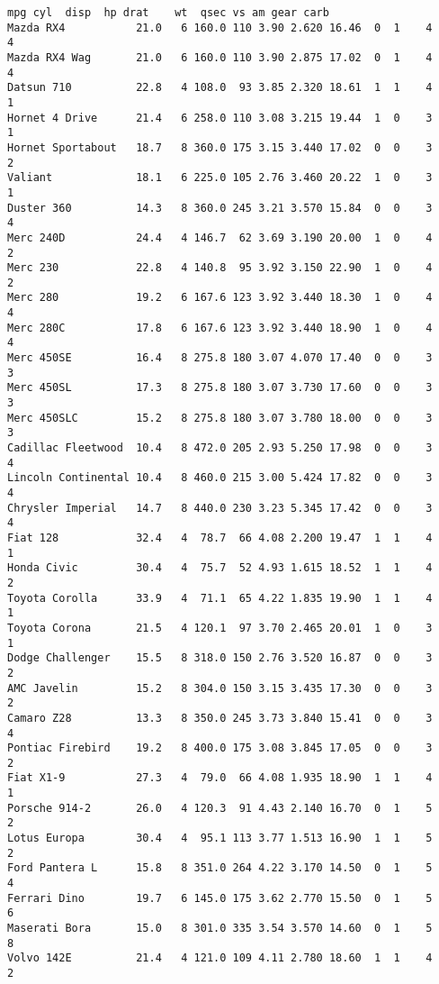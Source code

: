 \documentclass[11pt]{article}
\begin{document}
    \begin{Verbatim}[commandchars=\\\{\}]
                     mpg cyl  disp  hp drat    wt  qsec vs am gear carb
Mazda RX4           21.0   6 160.0 110 3.90 2.620 16.46  0  1    4    4
Mazda RX4 Wag       21.0   6 160.0 110 3.90 2.875 17.02  0  1    4    4
Datsun 710          22.8   4 108.0  93 3.85 2.320 18.61  1  1    4    1
Hornet 4 Drive      21.4   6 258.0 110 3.08 3.215 19.44  1  0    3    1
Hornet Sportabout   18.7   8 360.0 175 3.15 3.440 17.02  0  0    3    2
Valiant             18.1   6 225.0 105 2.76 3.460 20.22  1  0    3    1
Duster 360          14.3   8 360.0 245 3.21 3.570 15.84  0  0    3    4
Merc 240D           24.4   4 146.7  62 3.69 3.190 20.00  1  0    4    2
Merc 230            22.8   4 140.8  95 3.92 3.150 22.90  1  0    4    2
Merc 280            19.2   6 167.6 123 3.92 3.440 18.30  1  0    4    4
Merc 280C           17.8   6 167.6 123 3.92 3.440 18.90  1  0    4    4
Merc 450SE          16.4   8 275.8 180 3.07 4.070 17.40  0  0    3    3
Merc 450SL          17.3   8 275.8 180 3.07 3.730 17.60  0  0    3    3
Merc 450SLC         15.2   8 275.8 180 3.07 3.780 18.00  0  0    3    3
Cadillac Fleetwood  10.4   8 472.0 205 2.93 5.250 17.98  0  0    3    4
Lincoln Continental 10.4   8 460.0 215 3.00 5.424 17.82  0  0    3    4
Chrysler Imperial   14.7   8 440.0 230 3.23 5.345 17.42  0  0    3    4
Fiat 128            32.4   4  78.7  66 4.08 2.200 19.47  1  1    4    1
Honda Civic         30.4   4  75.7  52 4.93 1.615 18.52  1  1    4    2
Toyota Corolla      33.9   4  71.1  65 4.22 1.835 19.90  1  1    4    1
Toyota Corona       21.5   4 120.1  97 3.70 2.465 20.01  1  0    3    1
Dodge Challenger    15.5   8 318.0 150 2.76 3.520 16.87  0  0    3    2
AMC Javelin         15.2   8 304.0 150 3.15 3.435 17.30  0  0    3    2
Camaro Z28          13.3   8 350.0 245 3.73 3.840 15.41  0  0    3    4
Pontiac Firebird    19.2   8 400.0 175 3.08 3.845 17.05  0  0    3    2
Fiat X1-9           27.3   4  79.0  66 4.08 1.935 18.90  1  1    4    1
Porsche 914-2       26.0   4 120.3  91 4.43 2.140 16.70  0  1    5    2
Lotus Europa        30.4   4  95.1 113 3.77 1.513 16.90  1  1    5    2
Ford Pantera L      15.8   8 351.0 264 4.22 3.170 14.50  0  1    5    4
Ferrari Dino        19.7   6 145.0 175 3.62 2.770 15.50  0  1    5    6
Maserati Bora       15.0   8 301.0 335 3.54 3.570 14.60  0  1    5    8
Volvo 142E          21.4   4 121.0 109 4.11 2.780 18.60  1  1    4    2

    \end{Verbatim}
\end{document}
